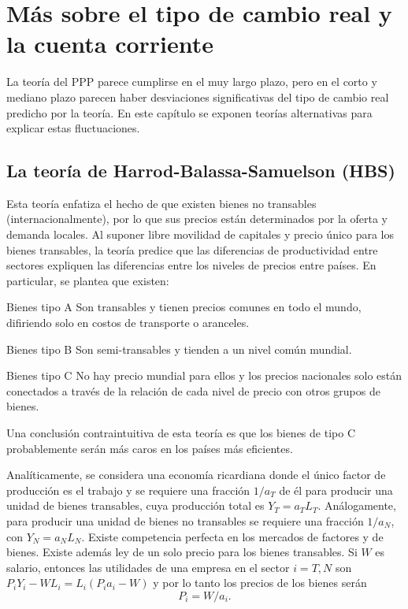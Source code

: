 \documentclass[DeGregorioResumen]{subfiles}
\begin{document}
\section{Más sobre el tipo de cambio real y la cuenta corriente}

La teoría del PPP parece cumplirse en el muy largo plazo, pero en el corto y mediano plazo parecen haber desviaciones significativas del tipo de cambio real predicho por la teoría. En este capítulo se exponen teorías alternativas para explicar estas fluctuaciones.

\subsection{La teoría de Harrod-Balassa-Samuelson (HBS)}

Esta teoría enfatiza el hecho de que existen bienes no transables (internacionalmente), por lo que sus precios están determinados por la oferta y demanda locales. Al suponer libre movilidad de capitales y precio único para los bienes transables, la teoría predice que las diferencias de productividad entre sectores expliquen las diferencias entre los niveles de precios entre países. En particular, se plantea que existen:

\begin{enumdescript}
\item [Bienes tipo A] Son transables y tienen precios comunes en todo el mundo, difiriendo solo en costos de transporte o aranceles.
\item [Bienes tipo B] Son semi-transables y tienden a un nivel común mundial.
\item [Bienes tipo C] No hay precio mundial para ellos y los precios nacionales solo están conectados a través de la relación de cada nivel de precio con otros grupos de bienes.
\end{enumdescript}

Una conclusión contraintuitiva de esta teoría es que los bienes de tipo C probablemente serán más caros en los países más eficientes.

Analíticamente, se considera una economía ricardiana donde el único factor de producción es el trabajo y se requiere una fracción $1/a_T$ de él para producir una unidad de bienes transables, cuya producción total es $Y_T=a_T L_T$. Análogamente, para producir una unidad de bienes no transables se requiere una fracción $1/a_N$, con $Y_N=a_N L_N$. Existe competencia perfecta en los mercados de factores y de bienes. Existe además ley de un solo precio para los bienes transables. Si $W$ es salario, entonces las utilidades de una empresa en el sector $i=T, N$ son $P_iY_i-WL_i=L_i(P_ia_i-W)$ y por lo tanto los precios de los bienes serán
\begin{equation}
P_i = W/a_i.
\label{eq:09-P_prod_salarios}
\end{equation}
\end{document}

